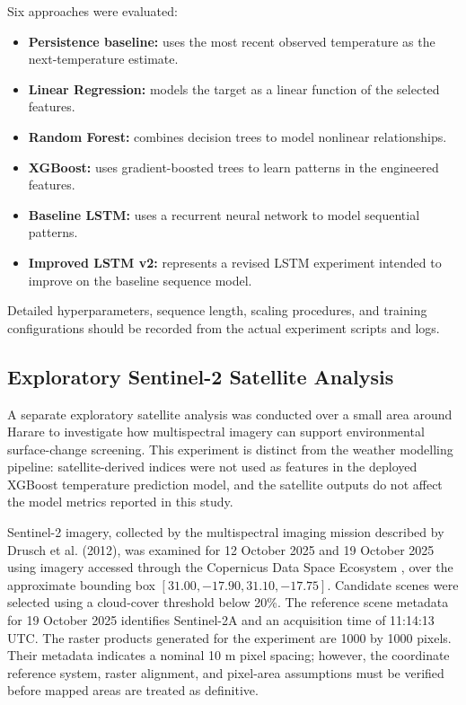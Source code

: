 \documentclass[12pt,a4paper]{article}
\begin{document}
	Six approaches were evaluated:
	\begin{itemize}[leftmargin=*]
		\item \textbf{Persistence baseline:} uses the most recent
		observed temperature as the next-temperature estimate.
		\item \textbf{Linear Regression:} models the target as a linear
		function of the selected features.
		\item \textbf{Random Forest:} combines decision trees to model
		nonlinear relationships.
		\item \textbf{XGBoost:} uses gradient-boosted trees to learn
		patterns in the engineered features.
		\item \textbf{Baseline LSTM:} uses a recurrent neural network
		to model sequential patterns.
		\item \textbf{Improved LSTM v2:} represents a revised LSTM
		experiment intended to improve on the baseline sequence model.
	\end{itemize}
	Detailed hyperparameters, sequence length, scaling procedures, and
	training configurations should be recorded from the actual
	experiment scripts and logs.
	
	\subsection{Exploratory Sentinel-2 Satellite Analysis}
	
	A separate exploratory satellite analysis was conducted over a small
	area around Harare to investigate how multispectral imagery can support
	environmental surface-change screening. This experiment is distinct
	from the weather modelling pipeline: satellite-derived indices were
	not used as features in the deployed XGBoost temperature prediction
	model, and the satellite outputs do not affect the model metrics
	reported in this study.
	
	Sentinel-2 imagery, collected by the multispectral imaging mission
	described by Drusch et al. (2012)\cite{drusch2012}, was examined for
	12 October 2025 and 19 October 2025 using imagery accessed through the
	Copernicus Data Space Ecosystem \cite{copernicusdataspace}, over the approximate bounding box
	$[31.00,-17.90,31.10,-17.75]$. Candidate scenes were selected using
	a cloud-cover threshold below 20\%. The reference scene metadata for
	19 October 2025 identifies Sentinel-2A and an acquisition time of
	11:14:13 UTC. The raster products generated for the experiment are
	1000 by 1000 pixels. Their metadata indicates a nominal 10 m pixel
	spacing; however, the coordinate reference system, raster alignment,
	and pixel-area assumptions must be verified before mapped areas are
	treated as definitive.
	
\end{document}
